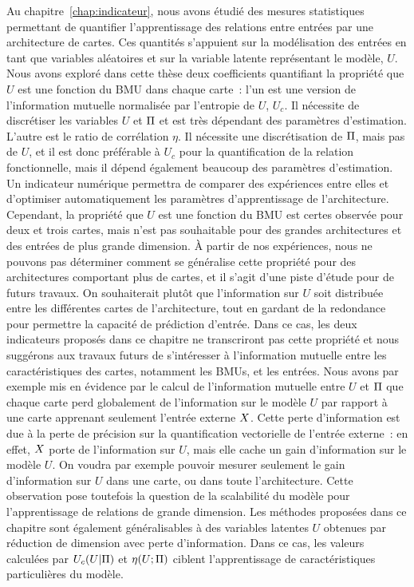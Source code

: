 Au chapitre~\ref{chap:indicateur}, nous avons étudié des mesures statistiques permettant de quantifier l'apprentissage des relations entre entrées par une architecture de cartes.
Ces quantités s'appuient sur la modélisation des entrées en tant que variables aléatoires et sur la variable latente représentant le modèle, $U$.
Nous avons exploré dans cette thèse deux coefficients quantifiant la propriété que $U$ est une fonction du BMU dans chaque carte~: l'un est une version de l'information mutuelle normalisée par l'entropie de $U$, $U_c$. Il nécessite de discrétiser les variables $U$ et $\Pi$ et est très dépendant des paramètres d'estimation.
L'autre est le ratio de corrélation $\eta$. Il nécessite une discrétisation de $\Pi$, mais pas de $U$, et il est donc préférable à $U_c$ pour la quantification de la relation fonctionnelle, mais il dépend également beaucoup des paramètres d'estimation.
Un indicateur numérique permettra de comparer des expériences entre elles et d'optimiser automatiquement les paramètres d'apprentissage de l'architecture.
Cependant, la propriété que $U$ est une fonction du BMU est certes observée pour deux et trois cartes, mais n'est pas souhaitable pour des grandes architectures et des entrées de plus grande dimension. \`A partir de nos expériences, nous ne pouvons pas déterminer comment se généralise cette propriété pour des architectures comportant plus de cartes, et il s'agit d'une piste d'étude pour de futurs travaux.
On souhaiterait plutôt que l'information sur $U$ soit distribuée entre les différentes cartes de l'architecture, tout en gardant de la redondance pour permettre la capacité de prédiction d'entrée.
Dans ce cas, les deux indicateurs proposés dans ce chapitre ne transcriront pas cette propriété et nous suggérons aux travaux futurs de s'intéresser à l'information mutuelle entre les caractéristiques des cartes, notamment les BMUs, et les entrées. Nous avons par exemple mis en évidence par le calcul de l'information mutuelle entre $U$ et $\Pi$ que chaque carte perd globalement de l'information sur le modèle $U$ par rapport à une carte apprenant seulement l'entrée externe $X$.
Cette perte d'information est due à la perte de précision sur la quantification vectorielle de l'entrée externe~: en effet, $X$ porte de l'information sur $U$, mais elle cache un gain d'information sur le modèle $U$.
On voudra par exemple pouvoir mesurer seulement le gain d'information sur $U$ dans une carte, ou dans toute l'architecture. Cette observation pose toutefois la question de la scalabilité du modèle pour l'apprentissage de relations de grande dimension.
Les méthodes proposées dans ce chapitre sont également généralisables à des variables latentes  $U$ obtenues par réduction de dimension avec perte d'information. 
Dans ce cas, les valeurs calculées par $U_c(U |\Pi)$ et $\eta(U;\Pi)$ ciblent l'apprentissage de caractéristiques particulières du modèle.

